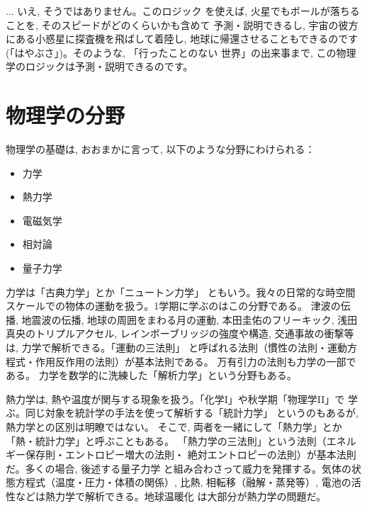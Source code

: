 \begin{faq}{\small{} ... いえ, そうではありません。このロジック
を使えば, 火星でもボールが落ちることを, そのスピードがどのくらいかも含めて
予測・説明できるし, 宇宙の彼方にある小惑星に探査機を飛ばして着陸し, 
地球に帰還させることもできるのです(「はやぶさ」)。そのような, 「行ったことのない
世界」の出来事まで, この物理学のロジックは予測・説明できるのです。}\end{faq}
\mv

\section{物理学の分野}

物理学の基礎は, おおまかに言って, 以下のような分野にわけられる：
\begin{itemize}
\item 力学
\item 熱力学
\item 電磁気学
\item 相対論
\item 量子力学
\end{itemize}

力学は「古典力学」とか「ニュートン力学」
ともいう。我々の日常的な時空間
スケールでの物体の運動を扱う。1学期に学ぶのはこの分野である。
津波の伝播, 地震波の伝播, 地球の周囲をまわる月の運動, 本田圭佑のフリーキック, 
浅田真央のトリプルアクセル, レインボーブリッジの強度や構造, 交通事故の衝撃等は, 
力学で解析できる。「運動の三法則」
と呼ばれる法則（慣性の法則・運動方程式・作用反作用の法則）が基本法則である。
万有引力の法則も力学の一部である。
力学を数学的に洗練した「解析力学」という分野もある。

熱力学は, 熱や温度が関与する現象を扱う。「化学I」や秋学期「物理学II」で
学ぶ。同じ対象を統計学の手法を使って解析する「統計力学」
というのもあるが, 熱力学との区別は明瞭ではない。
そこで, 両者を一緒にして「熱力学」とか「熱・統計力学」と呼ぶこともある。
「熱力学の三法則」という法則（エネルギー保存則・エントロピー増大の法則・
絶対エントロピーの法則）が基本法則だ。多くの場合, 後述する量子力学
と組み合わさって威力を発揮する。気体の状態方程式（温度・圧力・体積の関係）, 
比熱, 相転移（融解・蒸発等）, 電池の活性などは熱力学で解析できる。地球温暖化
は大部分が熱力学の問題だ。

